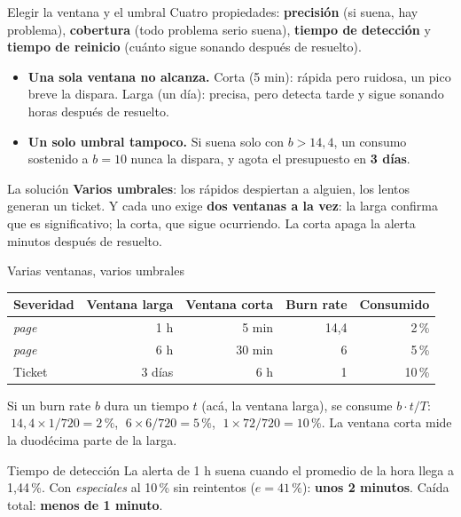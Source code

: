 \documentclass[institutional,screen,none]{ua-engineering-v6-beamer}
\begin{document}
\begin{frame}{Elegir la ventana y el umbral}
Cuatro propiedades: \textbf{precisión} (si suena, hay problema), \textbf{cobertura} (todo problema serio suena), \textbf{tiempo de detección} y \textbf{tiempo de reinicio} (cuánto sigue sonando después de resuelto).

\pause

\begin{itemize}\small
\item \textbf{Una sola ventana no alcanza.} Corta (5 min): rápida pero ruidosa, un pico breve la dispara. Larga (un día): precisa, pero detecta tarde y sigue sonando horas después de resuelto.
\pause
\item \textbf{Un solo umbral tampoco.} Si suena solo con $b > 14{,}4$, un consumo sostenido a $b = 10$ nunca la dispara, y agota el presupuesto en \textbf{3 días}.
\end{itemize}

\pause

\begin{block}{La solución}
\textbf{Varios umbrales}: los rápidos despiertan a alguien, los lentos generan un ticket. Y cada uno exige \textbf{dos ventanas a la vez}: la larga confirma que es significativo; la corta, que sigue ocurriendo. La corta apaga la alerta minutos después de resuelto.
\end{block}
\end{frame}

\begin{frame}{Varias ventanas, varios umbrales}
\begin{center}
\small
\begin{tabular}{lrrrr}
\toprule
\textbf{Severidad} & \textbf{Ventana larga} & \textbf{Ventana corta} & \textbf{Burn rate} & \textbf{Consumido} \\
\midrule
\emph{page} & 1 h & 5 min & 14,4 & 2\,\% \\
\emph{page} & 6 h & 30 min & 6 & 5\,\% \\
Ticket & 3 días & 6 h & 1 & 10\,\% \\
\bottomrule
\end{tabular}
\end{center}

\pause

{\small Si un burn rate $b$ dura un tiempo $t$ (acá, la ventana larga), se consume $b \cdot t / T$: $\;14{,}4 \times 1 / 720 = 2\,\%$, $\;6 \times 6 / 720 = 5\,\%$, $\;1 \times 72 / 720 = 10\,\%$. La ventana corta mide la duodécima parte de la larga.}

\pause

\begin{block}{Tiempo de detección}
La alerta de 1 h suena cuando el promedio de la hora llega a 1,44\,\%. Con \emph{especiales} al 10\,\% sin reintentos ($e = 41\,\%$): \textbf{unos 2 minutos}. Caída total: \textbf{menos de 1 minuto}.
\end{block}
\end{frame}
\end{document}
